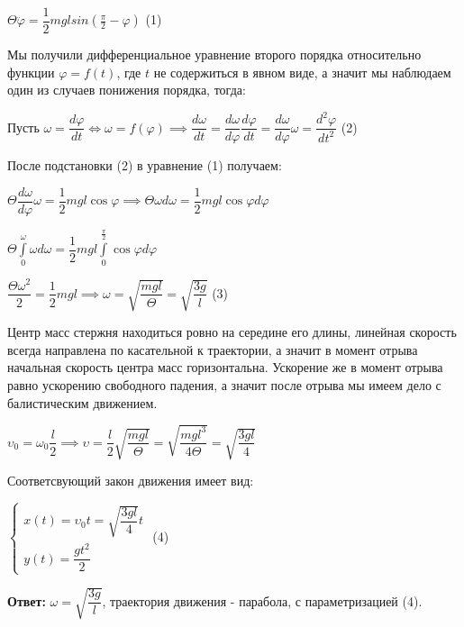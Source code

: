 \documentclass[a4paper, 12pt]{article}
\begin{document}
	\begin{center}
		$\Theta \ddot \varphi = \dfrac{1}{2} mg l sin(\frac{\pi}{2} - \varphi)$ (1)
	\end{center} 
	
	\quad  Мы получили дифференциальное уравнение второго порядка относительно функции $\varphi = f(t)$, где $t$ не содержиться в явном виде, а значит мы наблюдаем один из случаев понижения порядка, тогда:
	
	\begin{center}
		Пусть $\omega = \dfrac{d\varphi}{dt} \Leftrightarrow \omega = f(\varphi) \implies \dfrac{d\omega}{dt} = \dfrac{d\omega}{d\varphi} \dfrac{d\varphi}{dt} = \dfrac{d\omega}{d\varphi} \omega = \dfrac{d^2 \varphi}{dt^2}$ (2)
	\end{center}
	
	\quad После подстановки (2) в уравнение (1) получаем: 
	
	\begin{center}
		$\Theta \dfrac{d\omega}{d\varphi} \omega = \dfrac{1}{2} mgl \cos \varphi \implies \Theta \omega d\omega = \dfrac{1}{2} mgl \cos \varphi d \varphi $
		
		$\Theta \displaystyle \int \limits_{0}^{\omega} \omega d\omega = \dfrac{1}{2}mgl \displaystyle \int \limits_{0}^{\frac{\pi}{2}} \cos \varphi d \varphi $
		
		$\dfrac{\Theta \omega^2}{2} = \dfrac{1}{2}mgl \implies \omega = \sqrt{\dfrac{mgl}{\Theta}} = \sqrt{\dfrac{3g}{l}}$ (3)
		
	\end{center}
	
	\quad Центр масс стержня находиться ровно на середине его длины, линейная скорость всегда направлена по касательной к траектории, а значит в момент отрыва начальная скорость центра масс горизонтальна. Ускорение же в момент отрыва равно ускорению свободного падения, а значит после отрыва мы имеем дело с балистическим движением. 
	
	\begin{center}
		$\upsilon_0 = \omega_0 \dfrac{l}{2} \implies \upsilon = \dfrac{l}{2}  \sqrt{\dfrac{mgl}{\Theta}} =  \sqrt{\dfrac{mgl^3}{4\Theta}} = \sqrt{\dfrac{3gl}{4}}$
		
		Соответсвующий закон движения имеет вид:
		
		$\begin{cases}
			x(t) = \upsilon_0 t =  \sqrt{\dfrac{3gl}{4}} t \\
			y(t) = \dfrac{gt^2}{2} 
		\end{cases}$ (4)  
	\end{center}	
	
	\quad \textbf{Ответ:} $\omega = \sqrt{\dfrac{3g}{l}}$, траектория движения - парабола, с параметризацией (4).
	
\end{document}

